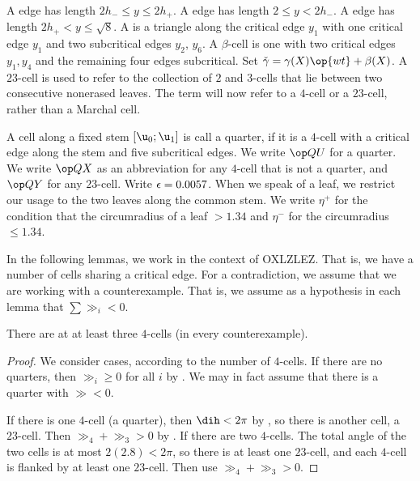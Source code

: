 \begin{definition}
A  edge has length $2h_-\le y\le 2h_+$.  A  edge has length $2\le y< 2h_-$.
A  edge has length $2h_+<y\le\sqrt8$.
A  is a triangle along the critical edge $y_1$ with one critical edge $y_1$ and two
subcritical edges $y_2$, $y_6$.
A $\beta$-cell is one with two critical edges $y_1,y_4$ and the remaining four edges subcritical.
Set $\gg = \gamma(X)\op{wt} + \beta(X)$.
A $23$-cell is used to refer to the collection of $2$ and $3$-cells that lie between two consecutive nonerased leaves.  The term  will now refer to a $4$-cell or a $23$-cell,
rather than a Marchal cell.

A cell along a fixed stem $[\u_0;\u_1]$ is call a quarter, if it
 is a $4$-cell with a critical edge along the stem and five subcritical edges.
We write $\QU$ for a quarter.
We write $\QX$ as an abbreviation for any $4$-cell that is not a quarter,
and $\QY$ for any $23$-cell. Write $\epsilon=0.0057$.
When we speak of a leaf, we restrict our usage to the two leaves along the common stem.
We write $\eta^+$ for the condition that the circumradius of a leaf $>1.34$ and
$\eta^-$ for the circumradius $\le 1.34$.
\end{definition}

In the following lemmas, we work in the context of OXLZLEZ.  That is, we have a number of cells sharing
a critical edge.  For a contradiction, we assume that we are working with a counterexample.  That is,
we assume as a hypothesis in each lemma that $\sum \gg_i < 0$.

\begin{lemma}\label{lemma:ox34}
There are at at least three $4$-cells (in every counterexample).
\end{lemma}

\begin{proof} We consider cases, according to the number of $4$-cells.  If there are no quarters, then
$\gg_i\ge0$ for all $i$ by .
We may in fact assume that there is a quarter with $\gg<0$.

If there is one $4$-cell (a quarter), then $\dih < 2\pi$ by , so there is another cell, a $23$-cell.
Then $\gg_4 + \gg_3 > 0$ by .
If there are two $4$-cells.  The total angle of the two cells is at most $2 (2.8) < 2\pi$, so there is at least one $23$-cell, and each $4$-cell is flanked by at least one $23$-cell.
Then use $\gg_4+\gg_3>0$.
\end{proof}

